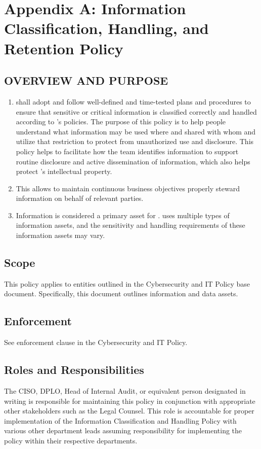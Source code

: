 \documentclass[../main.tex]{subfiles}
\begin{document}
\section{Appendix A: Information Classification, Handling, and Retention Policy}
\subsection{OVERVIEW AND PURPOSE}
\begin{enumerate}
    \item \CompanyName{} shall adopt and follow well-defined and time-tested plans and procedures to ensure that sensitive or critical information is classified correctly and
    handled according to \CompanyName's policies. The purpose of this policy is to help people understand what information may be used where and shared with whom and utilize that
    restriction to protect from unauthorized use and disclosure. This policy helps to facilitate how the \CompanyName{} team identifies information to support routine disclosure and
    active dissemination of information, which also helps protect \CompanyName's intellectual property.
    \item This allows \CompanyName{} to maintain continuous business objectives properly steward information on behalf of relevant parties.
    \item Information is considered a primary asset for \CompanyName. \CompanyName{} uses multiple types of information assets, and the sensitivity and handling requirements of these
    information assets may vary.
\end{enumerate}
\subsection{Scope}
This policy applies to entities outlined in the Cybersecurity and IT Policy base document. Specifically, this document outlines information and data assets.
\subsection{Enforcement}
See enforcement clause in the Cybersecurity and IT Policy.
\subsection{Roles and Responsibilities}
The CISO, DPLO, Head of Internal Audit, or equivalent person designated in writing is responsible for maintaining this policy in conjunction with appropriate other stakeholders such as
the Legal Counsel. This role is accountable for proper implementation of the Information Classification and Handling Policy with various other department leads assuming responsibility for
implementing the policy within their respective departments.
\end{document}
